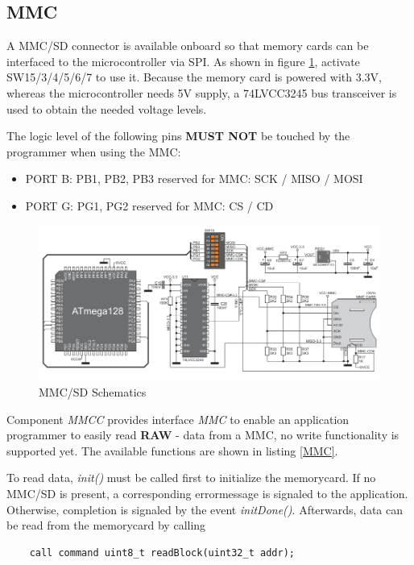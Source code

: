 \subsection{MMC}

A MMC/SD connector is available onboard so that memory cards can be interfaced to the microcontroller via SPI. As shown in figure \ref{fig:mmc}, activate SW15/3/4/5/6/7 to use it. Because the memory card is powered with 3.3V, whereas the microcontroller needs 5V supply, a 74LVCC3245 bus transceiver is used to obtain the needed voltage levels.

The logic level of the following pins \textbf{MUST NOT} be touched by the programmer when using the MMC:

\begin{itemize}
 \item PORT B: PB1, PB2, PB3			reserved for MMC: SCK / MISO / MOSI
 \item PORT G: PG1, PG2				reserved for MMC: CS / CD
\end{itemize}

\begin{figure}[h]
 \centerline{\includegraphics[width=.8\columnwidth]{pics/mmc.png}}
  \caption{MMC/SD Schematics}
  \label{fig:mmc}
\end{figure}

Component \textit{MMCC} provides interface \textit{MMC} to enable an application programmer to easily read \textbf{RAW} - data from a MMC, no write functionality is supported yet. The available functions are shown in listing \ref{MMC}. 

To read data, \textit{init()} must be called first to initialize the memorycard. If no MMC/SD is present, a corresponding errormessage is signaled to the application. Otherwise, completion is signaled by the event \textit{initDone()}. Afterwards, data can be read from the memorycard by calling

\begin{lstlisting}
	call command uint8_t readBlock(uint32_t addr);
\end{lstlisting}

